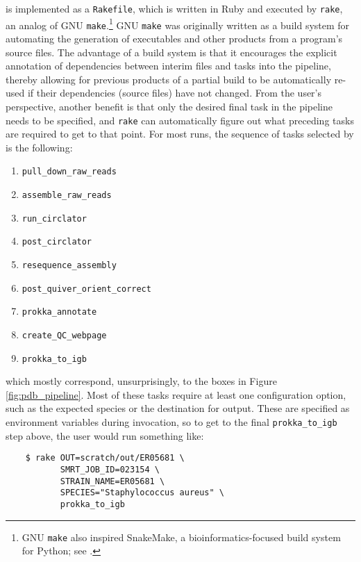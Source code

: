 \newthought{\pathogendbpipeline{}} is implemented as a \texttt{Rakefile}, which is written in Ruby and executed by \texttt{rake}, an analog of GNU \texttt{make}.\footnote{GNU \texttt{make} also inspired SnakeMake, a bioinformatics-focused build system for Python; see \textcite{Koster2012}.} GNU \texttt{make} was originally written as a build system for automating the generation of executables and other products from a program's source files. The advantage of a build system is that it encourages the explicit annotation of dependencies between interim files and tasks into the pipeline, thereby allowing for previous products of a partial build to be automatically re-used if their dependencies (source files) have not changed. From the user's perspective, another benefit is that only the desired final task in the pipeline needs to be specified, and \texttt{rake} can automatically figure out what preceding tasks are required to get to that point. For most runs, the sequence of tasks selected by \pathogendbpipeline{} is the following:

\begin{enumerate}[label=\arabic*.,noitemsep,labelindent=2em,leftmargin=!]
\item \verb|pull_down_raw_reads|
\item \verb|assemble_raw_reads|
\item \verb|run_circlator|
\item \verb|post_circlator|
\item \verb|resequence_assembly|
\item \verb|post_quiver_orient_correct|
\item \verb|prokka_annotate|
\item \verb|create_QC_webpage|
\item \verb|prokka_to_igb|
\end{enumerate}

which mostly correspond, unsurprisingly, to the boxes in Figure \ref{fig:pdb_pipeline}. Most of these tasks require at least one configuration option, such as the expected species or the destination for output. These are specified as environment variables during invocation, so to get to the final \verb|prokka_to_igb| step above, the user would run something like:

\begin{verbatim}
    $ rake OUT=scratch/out/ER05681 \
           SMRT_JOB_ID=023154 \
           STRAIN_NAME=ER05681 \
           SPECIES="Staphylococcus aureus" \
           prokka_to_igb
\end{verbatim}

